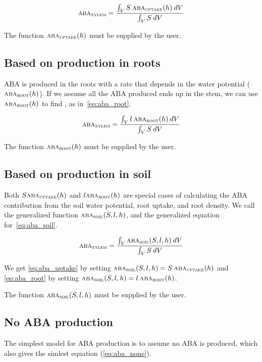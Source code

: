 \documentclass[a4paper,11pt,twoside]{article}
\newcommand{\aba}[1]{\text{\textsc{aba}$_\text{\textsc{#1}}$}}
\begin{document}
\begin{equation}
  \aba{xylem} = \frac{\int_V S \: \aba{uptake}(h) \: dV}{\int_V S \: dV}
  \label{eq:aba_uptake}
\end{equation}

The function $\aba{uptake}(h)$ must be supplied by the user.

\subsection{Based on production in roots}

ABA is produced in the roots with a rate that depends in the water
potential ($\aba{root}(h)$).  If we assume all the ABA produced ends up in
the stem, we can use $\aba{root}(h)$ to find \aba{xylem}, as
in~\eqref{eq:aba_root}.

\begin{equation}
  \aba{xylem} = \frac{\int_V l \: \aba{root}(h) \: dV}{\int_V S \: dV}
  \label{eq:aba_root}
\end{equation}

The function $\aba{root}(h)$ must be supplied by the user.

\subsection{Based on production in soil}

Both $S \aba{uptake}(h)$ and $l \aba{root}(h)$ are special cases of
calculating the ABA contribution from the soil water potential, root
uptake, and root density.  We call the generalized function
$\aba{soil}(S,l,h)$, and the generalized equation
for~\eqref{eq:aba_soil}.

\begin{equation}
  \aba{xylem} = \frac{\int_V \aba{soil}(S,l,h) \: dV}{\int_V S \: dV}
  \label{eq:aba_soil}
\end{equation}

We get \eqref{eq:aba_uptake} by setting $\aba{soil}(S,l,h) = S \:
\aba{uptake}(h)$ and \eqref{eq:aba_root} by setting $\aba{soil}(S,l,h) = l \:
\aba{root}(h)$.

The function $\aba{soil}(S,l,h)$ must be supplied by the user.

\subsection{No ABA production}

The simplest model for ABA production is to assume no ABA is produced,
which also gives the simlest equation (\eqref{eq:aba_none}).
\end{document}
